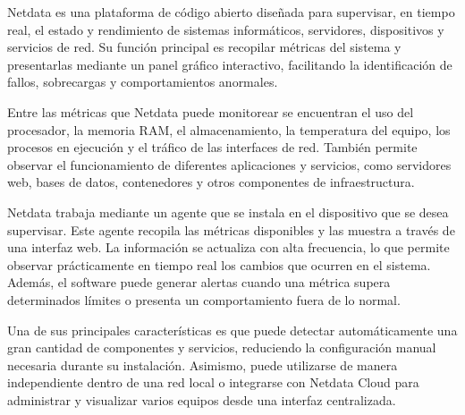 
Netdata es una plataforma de código abierto diseñada para supervisar, en tiempo real, el estado y rendimiento de sistemas informáticos, servidores, dispositivos y servicios de red. Su función principal es recopilar métricas del sistema y presentarlas mediante un panel gráfico interactivo, facilitando la identificación de fallos, sobrecargas y comportamientos anormales.

Entre las métricas que Netdata puede monitorear se encuentran el uso del procesador, la memoria RAM, el almacenamiento, la temperatura del equipo, los procesos en ejecución y el tráfico de las interfaces de red. También permite observar el funcionamiento de diferentes aplicaciones y servicios, como servidores web, bases de datos, contenedores y otros componentes de infraestructura. \cite{netdata-documentacion}

Netdata trabaja mediante un agente que se instala en el dispositivo que se desea supervisar. Este agente recopila las métricas disponibles y las muestra a través de una interfaz web. La información se actualiza con alta frecuencia, lo que permite observar prácticamente en tiempo real los cambios que ocurren en el sistema. Además, el software puede generar alertas cuando una métrica supera determinados límites o presenta un comportamiento fuera de lo normal.

Una de sus principales características es que puede detectar automáticamente una gran cantidad de componentes y servicios, reduciendo la configuración manual necesaria durante su instalación. Asimismo, puede utilizarse de manera independiente dentro de una red local o integrarse con Netdata Cloud para administrar y visualizar varios equipos desde una interfaz centralizada. \cite{netdata-documentacion}

